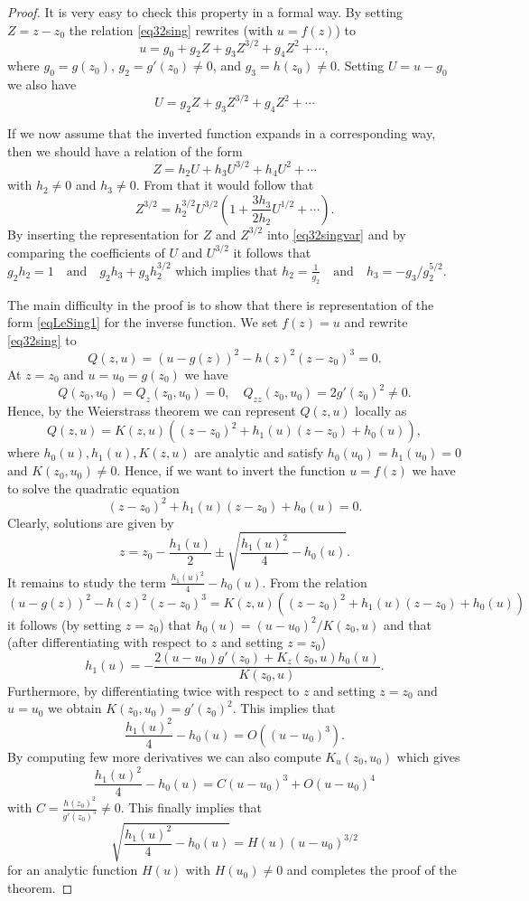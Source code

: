 \documentclass[10pt,a4paper]{amsart}
\begin{document}
\begin{proof}
It is very easy to check this property in a formal way. By setting
$Z = z-z_0$ the relation \cref{eq32sing} rewrites (with $u = f(z)$) to
\[
u = g_0 + g_2 Z + g_3 Z^{3/2} + g_4 Z^2 + \cdots,
\]
where $g_0 = g(z_0)$, $g_2 = g'(z_0) \ne 0$, and $g_3 = h(z_0) \ne 0$.
Setting $U = u-g_0$ we also have
\begin{equation}\label{eq32singvar}
U = g_2 Z + g_3 Z^{3/2} + g_4 Z^2 + \cdots
\end{equation}

If we now assume that the inverted function expands in a corresponding
way, then we should have a relation of the form
\[
Z = h_2 U + h_3 U^{3/2} + h_4 U^2 + \cdots
\]
with $h_2\ne 0$ and $h_3\ne 0$.
From that it would follow that
\[
Z^{3/2} = h_2^{3/2} U^{3/2}\left( 1 + \frac{3h_3}{2h_2} U^{1/2} + \cdots \right).
\]
By inserting the representation for $Z$ and $Z^{3/2}$ into \cref{eq32singvar}
and by comparing the coefficients of $U$ and $U^{3/2}$ it follows that
$
g_2 h_2 = 1 \quad \mbox{and} \quad g_2 h_3 + g_3 h_2^{3/2}
$
which implies that
$
h_2 = \frac 1{g_2} \quad \mbox{and} \quad h_3 = -{g_3}/{g_2^{5/2}}.
$

The main difficulty in the proof is to show that there is representation
of the form \cref{eqLeSing1} for the inverse function.
    We set $f(z) = u$ and rewrite \cref{eq32sing} to
    \[
    Q(z,u) = (u- g(z))^2 - h(z)^2 (z-z_0)^3 = 0.
    \]
    At $z=z_0$ and $u = u_0 = g(z_0)$ we have
    \[
    Q(z_0,u_0) = Q_{z}(z_0,u_0) = 0, \quad  Q_{zz}(z_0,u_0) = 2g'(z_0)^2 \ne 0.
    \]
    Hence, by the Weierstrass theorem we can represent $Q(z,u)$ locally as
    \[
    Q(z,u) = K(z,u)( (z-z_0)^2 + h_1(u)(z-z_0) + h_0(u)),
    \]
    where $h_0(u), h_1(u), K(z,u)$ are analytic and satisfy
    $h_0(u_0) = h_1(u_0) = 0$ and $K(z_0,u_0) \ne 0$.
    Hence, if we want to invert the function $u = f(z)$
    we have to solve the quadratic equation
    \[
    (z-z_0)^2 + h_1(u)(z-z_0) + h_0(u) = 0.
    \]
    Clearly, solutions are given by
    \[
    z = z_0 - \frac{h_1(u)}2 \pm \sqrt{\frac{h_1(u)^2}4 - h_0(u)}.
    \]
    It remains to study the term $\frac{h_1(u)^2}4 - h_0(u)$. 
    From the relation
    \[
    (u- g(z))^2 - h(z)^2 (z-z_0)^3 = K(z,u)( (z-z_0)^2 + h_1(u)(z-z_0) + h_0(u))
    \]
    it follows (by setting $z=z_0$) that
    $
    h_0(u) = {(u-u_0)^2}/{K(z_0,u)}
    $
    and that (after differentiating with respect to $z$ and setting $z=z_0$)
    \[
    h_1(u) = - \frac{2(u-u_0)g'(z_0) + K_z(z_0,u)h_0(u)}{K(z_0,u)}.
    \]
    Furthermore, by differentiating twice with respect to $z$ and setting
    $z=z_0$ and $u=u_0$ we obtain
    $
    K(z_0,u_0) = g'(z_0)^2.
    $
    This implies that
    \[
    \frac{h_1(u)^2}4 - h_0(u) = O((u-u_0)^3).  
    \]
    By computing few more derivatives we can also compute $K_u(z_0,u_0)$
    which gives 
    \[
    \frac{h_1(u)^2}4 - h_0(u) = C(u-u_0)^3   + O(u-u_0)^4
    \]
    with
    $
    C = \frac{h(z_0)^2}{ g'(z_0)^5} \ne 0.
    $
    This finally implies that
    \[
    \sqrt{\frac{h_1(u)^2}4 - h_0(u)} = H(u) (u-u_0)^{3/2}
    \]
    for an analytic function $H(u)$ with $H(u_0)\ne 0$ and completes the proof of the theorem.
\end{proof}
\end{document}

